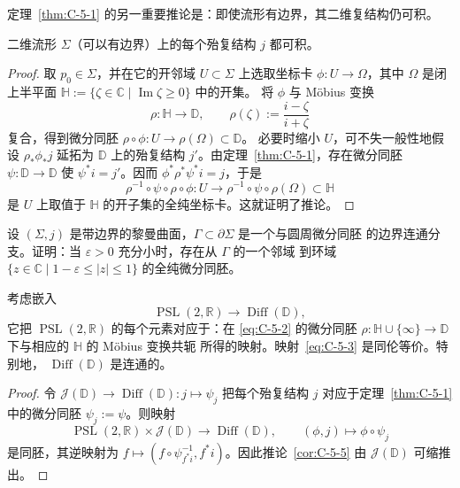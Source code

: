 定理~\ref{thm:C-5-1} 的另一重要推论是：即使流形有边界，其二维复结构仍可积。

\begin{corollary}[可积性]\label{cor:C-5-3}
二维流形 $\Sigma$（可以有边界）上的每个殆复结构 $j$ 都可积。
\end{corollary}

\begin{proof}
取 $p_0\in\Sigma$，并在它的开邻域 $U\subset\Sigma$ 上选取坐标卡
$\phi:U\to\Omega$，其中 $\Omega$ 是闭上半平面
$\mathbb H:=\{\zeta\in\mathbb C\mid\operatorname{Im}\zeta\ge0\}$ 中的开集。
将 $\phi$ 与 Möbius 变换
\begin{equation}\label{eq:C-5-2}
  \rho:\mathbb H\to\mathbb D,\qquad
  \rho(\zeta):=\frac{i-\zeta}{i+\zeta}
\end{equation}
复合，得到微分同胚 $\rho\circ\phi:U\to\rho(\Omega)\subset\mathbb D$。
必要时缩小 $U$，可不失一般性地假设 $\rho_*\phi_*j$ 延拓为
$\mathbb D$ 上的殆复结构 $j'$。由定理~\ref{thm:C-5-1}，存在微分同胚
$\psi:\mathbb D\to\mathbb D$ 使 $\psi^*i=j'$。因而
$\phi^*\rho^*\psi^*i=j$，于是
\[
  \rho^{-1}\circ\psi\circ\rho\circ\phi:
  U\longrightarrow\rho^{-1}\circ\psi\circ\rho(\Omega)\subset\mathbb H
\]
是 $U$ 上取值于 $\mathbb H$ 的开子集的全纯坐标卡。这就证明了推论。
\end{proof}

\begin{exercise}\label{ex:C-5-4}
设 $(\Sigma,j)$ 是带边界的黎曼曲面，$\Gamma\subset\partial\Sigma$ 是一个与圆周微分同胚
的边界连通分支。证明：当 $\varepsilon>0$ 充分小时，存在从 $\Gamma$ 的一个邻域
到环域 $\{z\in\mathbb C\mid1-\varepsilon\le|z|\le1\}$ 的全纯微分同胚。
\end{exercise}

\begin{corollary}\label{cor:C-5-5}
考虑嵌入
\begin{equation}\label{eq:C-5-3}
  \operatorname{PSL}(2,\mathbb R)\longrightarrow\operatorname{Diff}(\mathbb D),
\end{equation}
它把 $\operatorname{PSL}(2,\mathbb R)$ 的每个元素对应于：在
\eqref{eq:C-5-2} 的微分同胚
$\rho:\mathbb H\cup\{\infty\}\to\mathbb D$ 下与相应的 $\mathbb H$ 的 Möbius 变换共轭
所得的映射。映射~\eqref{eq:C-5-3} 是同伦等价。特别地，
$\operatorname{Diff}(\mathbb D)$ 是连通的。
\end{corollary}

\begin{proof}
令 $\mathcal J(\mathbb D)\to\operatorname{Diff}(\mathbb D):j\mapsto\psi_j$
把每个殆复结构 $j$ 对应于定理~\ref{thm:C-5-1} 中的微分同胚
$\psi_j:=\psi$。则映射
\[
  \operatorname{PSL}(2,\mathbb R)\times\mathcal J(\mathbb D)
  \longrightarrow\operatorname{Diff}(\mathbb D),\qquad
  (\phi,j)\longmapsto\phi\circ\psi_j
\]
是同胚，其逆映射为
$f\mapsto(f\circ\psi_{f^*i}^{-1},f^*i)$。因此推论~\ref{cor:C-5-5}
由 $\mathcal J(\mathbb D)$ 可缩推出。
\end{proof}

